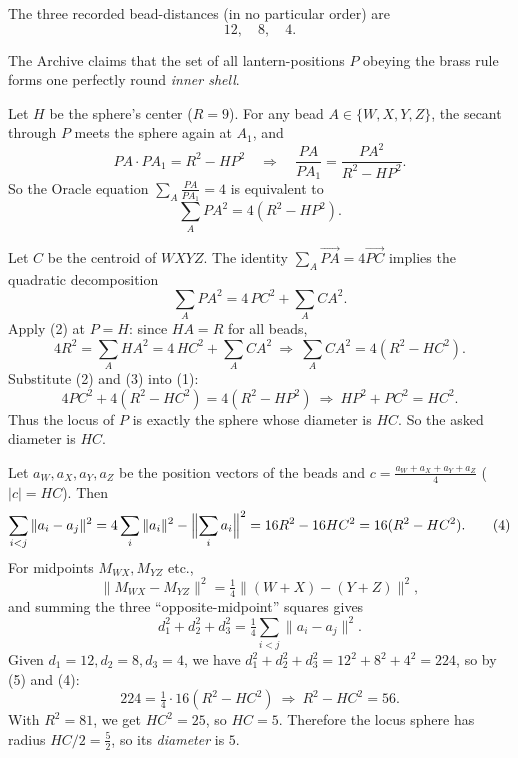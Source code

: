 The three recorded bead-distances (in no particular order) are
\[
12,\quad 8,\quad 4.
\]

The Archive claims that the set of all lantern-positions $P$ obeying the brass rule forms one perfectly round \emph{inner shell}.

\SolutionPage
\small
Let \(H\) be the sphere’s center (\(R=9\)). For any bead \(A\in\{W,X,Y,Z\}\), the secant through \(P\) meets the sphere again at \(A_1\), and
\[
P A\cdot P A_1=R^2-HP^2 \quad\Rightarrow\quad \frac{PA}{PA_1}=\frac{PA^2}{R^2-HP^2}.
\]
So the Oracle equation
\(\sum_{A}\frac{PA}{PA_1}=4\) is equivalent to
\[
\sum_A PA^2=4(R^2-HP^2). \tag{1}
\]

Let \(C\) be the centroid of \(WXYZ\). The identity \(\sum_A \overrightarrow{PA} = 4\overrightarrow{PC}\) implies the quadratic decomposition
\[
\sum_A PA^2 = 4\,PC^2+\sum_A CA^2. \tag{2}
\]
Apply (2) at \(P=H\): since \(HA=R\) for all beads,
\[
4R^2=\sum_A HA^2 = 4\,HC^2+\sum_A CA^2 \ \Rightarrow\ \sum_A CA^2=4(R^2-HC^2). \tag{3}
\]
Substitute (2) and (3) into (1):
\[
4PC^2+4(R^2-HC^2)=4(R^2-HP^2)
\ \Longrightarrow\ 
HP^2+PC^2=HC^2.
\]
Thus the locus of \(P\) is exactly the sphere whose diameter is \(HC\). So the asked diameter is \(HC\).

Let \(a_W,a_X,a_Y,a_Z\) be the position vectors of the beads and \(c=\frac{a_W+a_X+a_Y+a_Z}{4}\) (\(|c|=HC\)).
Then
\[
\sum_{i<j}\|a_i-a_j\|^2=4\sum_i\|a_i\|^2-\Bigl\|\sum_i a_i\Bigr\|^2
=16R^2-16HC^2=16(R^2-HC^2). \tag{4}
\]
For midpoints \(M_{WX},M_{YZ}\) etc.,
\[
\|M_{WX}-M_{YZ}\|^2=\tfrac14\|(W+X)-(Y+Z)\|^2,
\]
and summing the three “opposite-midpoint” squares gives
\[
d_1^2+d_2^2+d_3^2=\tfrac14\sum_{i<j}\|a_i-a_j\|^2. \tag{5}
\]
Given $d_1=12,d_2=8,d_3=4$, we have $d_1^2+d_2^2+d_3^2=12^2+8^2+4^2=224$, so by (5) and (4):
\[
224=\tfrac14\cdot 16(R^2-HC^2)\ \Rightarrow\ R^2-HC^2=56.
\]
With \(R^2=81\), we get \(HC^2=25\), so \(HC=5\). Therefore the locus sphere has radius \(HC/2=\boxed{\tfrac52}\), so its \emph{diameter} is \(\boxed{5}\).


\NextPage
